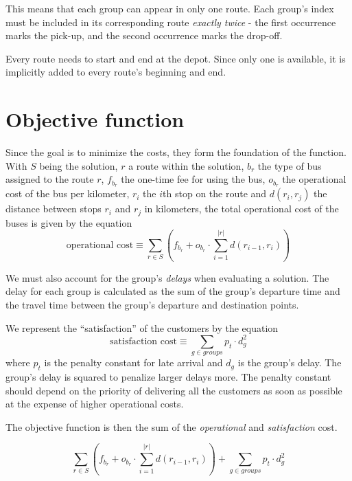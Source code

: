 This means that each group can appear in only one route. Each group's index must be included in its corresponding route \textit{exactly twice} - the first occurrence marks the pick-up, and the second occurrence marks the drop-off.

Every route needs to start and end at the depot. Since only one is available, it is implicitly added to every route's beginning and end.

\section{Objective function}
\label{sec:objective}

Since the goal is to minimize the costs, they form the foundation of the function. With $S$ being the solution, $r$ a route within the solution, $b_r$ the type of bus assigned to the route $r$, $f_{b_r}$ the one-time fee for using the bus, $o_{b_r}$ the operational cost of the bus per kilometer, $r_i$ the $i$th stop on the route and $d(r_i, r_j)$ the distance between stops $r_i$ and $r_j$ in kilometers, the total operational cost of the buses is given by the equation
\begin{equation}\label{eq:objective_costs}
    \text{operational cost} \equiv \sum_{r \in S} ( f_{b_r} + o_{b_r} \cdot \sum_{i=1}^{|r|}d(r_{i-1},r_{i}))
\end{equation}


We must also account for the group's \textit{delays} when evaluating a solution. The delay for each group is calculated as the sum of the group's departure time and the travel time between the group’s departure and destination points.

We represent the ``satisfaction'' of the customers by the equation
\begin{equation}\label{eq:objective_satisfaction}
     \text{satisfaction cost} \equiv \sum_{g \in groups} p_t \cdot d_g^2
\end{equation}
where $p_t$ is the penalty constant for late arrival and $d_g$ is the group's delay. The group's delay is squared to penalize larger delays more. The penalty constant should depend on the priority of delivering all the customers as soon as possible at the expense of higher operational costs.

The objective function is then the sum of the \textit{operational} and \textit{satisfaction} cost.

\begin{equation}\label{eq:objective}
    \sum_{r \in S} ( f_{b_r} + o_{b_r} \cdot \sum_{i=1}^{|r|}d(r_{i-1},r_{i})) + \sum_{g \in groups} p_t \cdot d_g^2
\end{equation}

